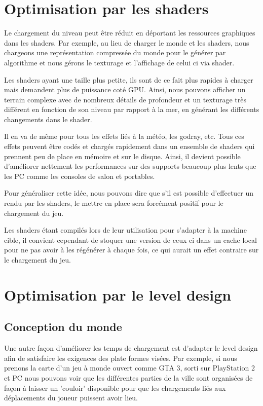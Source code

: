 \documentclass[a4paper, 11pt]{article} %
\begin{document}
\section*{Optimisation par les shaders}
Le chargement du niveau peut être réduit en déportant les ressources graphiques dans les shaders. Par exemple, au lieu de charger le monde et les shaders, nous chargeons une représentation compressée du monde pour le générer par algorithme et nous gérons le texturage et l'affichage de celui ci via shader. 

Les shaders ayant une taille plus petite, ils sont de ce fait plus rapides à charger mais demandent plus de puissance coté GPU. Ainsi, nous pouvons afficher un terrain complexe avec de nombreux détails de profondeur et un texturage très différent en fonction de son niveau par rapport à la mer, en générant les différents changements dans le shader.

Il en va de même pour tous les effets liés à la météo, les godray, etc. Tous ces effets peuvent être codés et chargés rapidement dans un ensemble de shaders qui prennent peu de place en mémoire et sur le disque. Ainsi, il devient possible d'améliorer nettement les performances sur des supports beaucoup plus lents que les PC comme les consoles de salon et portables.

Pour généraliser cette idée, nous pouvons dire que s'il est possible d'effectuer un rendu par les shaders, le mettre en place sera forcément positif pour le chargement du jeu.

Les shaders étant compilés lors de leur utilisation pour s'adapter à la machine cible, il convient cependant de stoquer une version de ceux ci dans un cache local pour ne pas avoir à les régénérer à chaque fois, ce qui aurait un effet contraire sur le chargement du jeu.

\newpage
\section{Optimisation par le level design}
\subsection{Conception du monde}
Une autre façon d'améliorer les temps de chargement est d'adapter le level design afin de satisfaire les exigences des plate formes visées. Par exemple, si nous prenons la carte d'un jeu à monde ouvert comme GTA 3, sorti sur PlayStation 2 et PC nous pouvons voir que les différentes parties de la ville sont organisées de façon à laisser un 'couloir' disponible pour que les chargements liés aux déplacements du joueur puissent avoir lieu.
\end{document}
